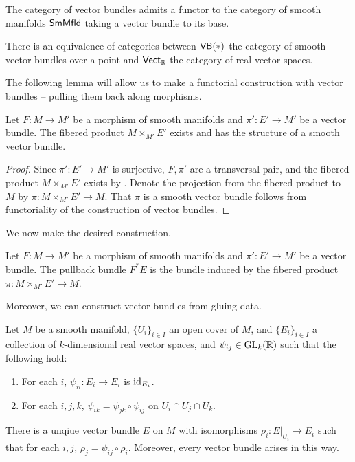 \begin{remark}
    The category of vector bundles admits a functor to the category of smooth manifolds $\mathsf{SmMfld}$ taking a vector bundle to its base. 
\end{remark}
\begin{remark}
    There is an equivalence of categories between $\mathsf{VB}(*)$ the category of smooth vector bundles over a point and $\mathsf{Vect}_{\mathbb{R}}$ the category of real vector spaces. 
\end{remark}
The following lemma will allow us to make a functorial construction with vector bundles -- pulling them back along morphisms. 
\begin{lemma}\label{lem: pullbacks of vector bundles exist}
    Let $F:M\to M'$ be a morphism of smooth manifolds and $\pi':E'\to M'$ be a vector bundle. The fibered product $M\times_{M'}E'$ exists and has the structure of a smooth vector bundle. 
\end{lemma}
\begin{proof}
   Since $\pi':E'\to M'$ is surjective, $F, \pi'$ are a transversal pair, and the fibered product $M\times_{M'}E'$ exists by . Denote the projection from the fibered product to $M$ by $\pi:M\times_{M'}E'\to M$. That $\pi$ is a smooth vector bundle follows from functoriality of the construction of vector bundles. 
\end{proof}
We now make the desired construction. 
\begin{definition}\label{def: pullback of vector bundles}
    Let $F:M\to M'$ be a morphism of smooth manifolds and $\pi':E'\to M'$ be a vector bundle. The pullback bundle $F^{*}E$ is the bundle induced by the fibered product $\pi:M\times_{M'}E'\to M$. 
\end{definition}
Moreover, we can construct vector bundles from gluing data. 
\begin{lemma}\label{lem: gluing vector bundles}
    Let $M$ be a smooth manifold, $\{U_{i}\}_{i\in I}$ an open cover of $M$, and $\{E_{i}\}_{i\in I}$ a collection of $k$-dimensional real vector spaces, and $\psi_{ij}\in\mathrm{GL}_{k}(\mathbb{R})$ such that the following hold:
    \begin{enumerate}[label=(\arabic*)]
        \item For each $i$, $\psi_{ii}:E_{i}\to E_{i}$ is $\mathrm{id}_{E_{i}}$. 
        \item For each $i,j,k$, $\psi_{ik}=\psi_{jk}\circ\psi_{ij}$ on $U_{i}\cap U_{j}\cap U_{k}$. 
    \end{enumerate}
   There is a unqiue vector bundle $E$ on $M$ with isomorphisms $\rho_{i}:E|_{U_{i}}\to E_{i}$ such that for each $i,j$, $\rho_{j}=\psi_{ij}\circ\rho_{i}$. Moreover, every vector bundle arises in this way. 
\end{lemma}
